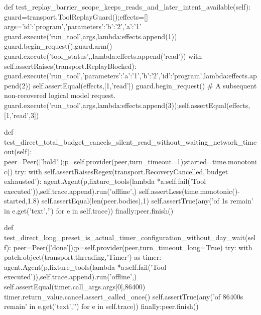 {    def test_replay_barrier_scope_keeps_reads_and_later_intent_available(self):
        guard=transport.ToolReplayGuard();effects=[]
        args={'id':'program','parameters':{'b':'2','a':'1'}}
        guard.execute('run_tool',args,lambda:effects.append(1))
        guard.begin_request();guard.arm()
        guard.execute('tool_status',{},lambda:effects.append('read'))
        with self.assertRaises(transport.ReplayBlocked):
            guard.execute('run_tool',{'parameters':{'a':'1','b':'2'},'id':'program'},lambda:effects.append(2))
        self.assertEqual(effects,[1,'read'])
        guard.begin_request() # A subsequent non-recovered logical model request.
        guard.execute('run_tool',args,lambda:effects.append(3));self.assertEqual(effects,[1,'read',3])

    def test_direct_total_budget_cancels_silent_read_without_waiting_network_timeout(self):
        peer=Peer(['hold']);p=self.provider(peer,turn_timeout=1);started=time.monotonic()
        try:
            with self.assertRaisesRegex(transport.RecoveryCancelled,'budget exhausted'):
                agent.Agent(p,fixture_tools(lambda *a:self.fail('Tool executed')),self.trace.append).run('offline',{})
            self.assertLess(time.monotonic()-started,1.8)
            self.assertEqual(len(peer.bodies),1)
            self.assertTrue(any('of 1s remain' in e.get('text','') for e in self.trace))
        finally:peer.finish()

    def test_direct_long_preset_is_actual_timer_configuration_without_day_wait(self):
        peer=Peer(['done']);p=self.provider(peer,turn_timeout_long=True)
        try:
            with patch.object(transport.threading,'Timer') as timer:
                agent.Agent(p,fixture_tools(lambda *a:self.fail('Tool executed')),self.trace.append).run('offline',{})
                self.assertEqual(timer.call_args.args[0],86400)
                timer.return_value.cancel.assert_called_once()
            self.assertTrue(any('of 86400s remain' in e.get('text','') for e in self.trace))
        finally:peer.finish()

}
